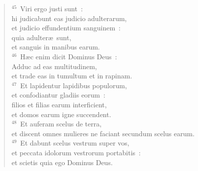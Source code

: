 \begin{flushleft}
\begin{verse}
${}^{45}$~Viri ergo justi sunt~:\\ hi judicabunt eas judicio adulterarum,\\ et judicio effundentium sanguinem~:\\ quia adulter\ae\ sunt,\\ et sanguis in manibus earum.\\
${}^{46}$~H\ae c enim dicit Dominus Deus~:\\ Adduc ad eas multitudinem,\\ et trade eas in tumultum et in rapinam.\\
${}^{47}$~Et lapidentur lapidibus populorum,\\ et confodiantur gladiis eorum~:\\ filios et filias earum interficient,\\ et domos earum igne succendent.\\
${}^{48}$~Et auferam scelus de terra,\\ et discent omnes mulieres ne faciant secundum scelus earum.\\
${}^{49}$~Et dabunt scelus vestrum super vos,\\ et peccata idolorum vestrorum portabitis~:\\ et scietis quia ego Dominus Deus.\end{verse}\end{flushleft}



